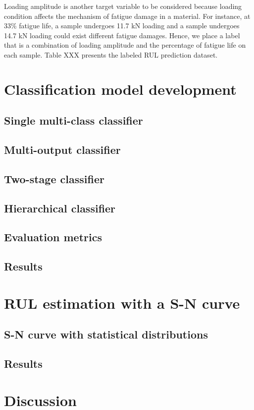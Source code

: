 Loading amplitude is another target variable to be considered because loading condition affects the mechanism of fatigue damage in a material. For instance, at 33\% fatigue life, a sample undergoes 11.7 kN loading and a sample undergoes 14.7 kN loading could exist different fatigue damages. Hence, we place a label that is a combination of loading amplitude and the percentage of fatigue life on each sample. Table XXX presents the labeled RUL prediction dataset.


\section{Classification model development}
\subsection{Single multi-class classifier}
\subsection{Multi-output classifier}
\subsection{Two-stage classifier}
\subsection{Hierarchical classifier}
\subsection{Evaluation metrics}
\subsection{Results}
\section{RUL estimation with a S-N curve}
\subsection{S-N curve with statistical distributions}
\subsection{Results}
\section{Discussion}